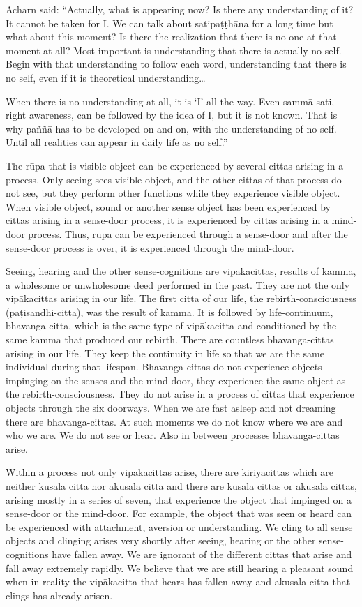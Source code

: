 {{{{{{{{{{Acharn said:
``Actually,
what is appearing now? Is there any understanding of it? It cannot be
taken for I. We can talk about satipaṭṭhāna for a long time but what
about this moment? Is there the realization that there is no one at that
moment at all? Most important is understanding that there is actually no
self. Begin with that understanding to follow each word, understanding
that there is no self, even if it is theoretical understanding\ldots{
When there is no understanding at all, it is `I' all the
way.
Even sammā-sati, right awareness, can
be followed by the idea of I, but it is not known. That is why paññā has
to be developed on and on, with the understanding of no self. Until all
realities can appear in daily life as no self.''

The rūpa that is
visible object can be experienced by
several cittas arising in a process. Only seeing sees visible object,
and the other cittas of that process do not see, but they perform other
functions while they experience visible object. When visible object,
sound or another sense object has been experienced by cittas arising in
a sense-door process, it is experienced by cittas arising in a mind-door
process. Thus, rūpa can be experienced through a sense-door and after
the sense-door process is over, it is experienced through the
mind-door.

Seeing, hearing and the other
sense-cognitions are vipākacittas, results of kamma, a wholesome or
unwholesome deed performed in the past. They are not the only
vipākacittas arising in our life. The first citta of our life, the
rebirth-consciousness (paṭisandhi-citta), was the result of kamma. It is
followed by life-continuum, bhavanga-citta, which is the same type of
vipākacitta and conditioned by the same kamma that produced our rebirth.
There are countless bhavanga-cittas arising in our life. They keep the
continuity in life so that we are the same individual during that
lifespan. Bhavanga-cittas do not experience objects impinging on the
senses and the mind-door, they experience the same object as the
rebirth-consciousness. They do not arise in a process of cittas that
experience objects through the six doorways. When we are fast asleep and
not dreaming there are bhavanga-cittas. At such moments we do not know
where we are and who we are. We do not see or hear. Also in between
processes bhavanga-cittas arise. 

Within a process not only vipākacittas
arise, there are kiriyacittas which are neither kusala citta nor akusala
citta and there are kusala cittas or akusala cittas, arising mostly in a
series of seven, that experience the object that impinged on a
sense-door or the mind-door. For example, the object that was seen or
heard can be experienced with attachment, aversion or understanding. We
cling to all sense objects and clinging arises very shortly after
seeing, hearing or the other sense-cognitions have fallen away. We are
ignorant of the different cittas that arise and fall away extremely
rapidly. We believe that we are still hearing a pleasant sound when in
reality the vipākacitta that hears has fallen away and akusala citta
that clings has already arisen. 

}}}}}}}}}}}
